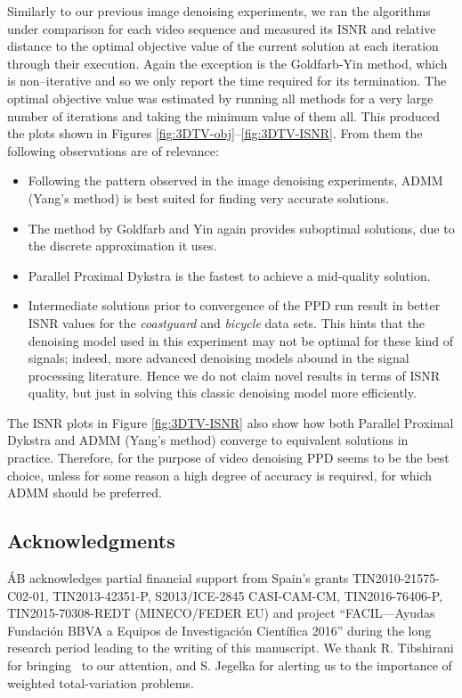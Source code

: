 \documentclass[twoside,11pt]{article}
\numberwithin{equation}{section}
\numberwithin{theorem}{section}
\begin{document}
Similarly to our previous image denoising experiments, we ran the algorithms under comparison for each video sequence and measured its ISNR and relative distance to the optimal objective value of the current solution at each iteration through their execution. Again the exception is the Goldfarb-Yin method, which is non--iterative and so we only report the time required for its termination. The optimal objective value was estimated by running all methods for a very large number of iterations and taking the minimum value of them all. This produced the plots shown in Figures \ref{fig:3DTV-obj}--\ref{fig:3DTV-ISNR}. From them the following observations are of relevance:
\begin{itemize}
  \setlength{\itemsep}{1pt}
 \item Following the pattern observed in the image denoising experiments, ADMM (Yang's method) is best suited for finding very accurate solutions.
 \item The method by Goldfarb and Yin again provides suboptimal solutions, due to the discrete approximation it uses.
 \item Parallel Proximal Dykstra is the fastest to achieve a mid-quality solution.
 \item Intermediate solutions prior to convergence of the PPD run result in better ISNR values for the {\it coastguard} and {\it bicycle} data sets. This hints that the denoising model used in this experiment may not be optimal for these kind of signals; indeed, more advanced denoising models abound in the signal processing literature. Hence we do not claim novel results in terms of ISNR quality, but just in solving this classic denoising model more efficiently.
\end{itemize}

The ISNR plots in Figure \ref{fig:3DTV-ISNR} also show how both Parallel Proximal Dykstra and ADMM (Yang's method) converge to equivalent solutions in practice. Therefore, for the purpose of video denoising PPD seems to be the best choice, unless for some reason a high degree of accuracy is required, for which ADMM should be preferred.

\subsection*{Acknowledgments}
ÁB acknowledges partial financial support from Spain’s grants TIN2010-21575-C02-01, TIN2013-42351-P, S2013/ICE-2845 CASI-CAM-CM, TIN2016-76406-P, TIN2015-70308-REDT (MINECO/FEDER EU) and project ``FACIL—Ayudas Fundación BBVA a Equipos de Investigación Científica 2016'' during the long research period leading to the writing of this manuscript. We thank R. Tibshirani for bringing~\citep{dpTV} to our attention, and S. Jegelka for alerting us to the importance of weighted total-variation problems.
\end{document}
